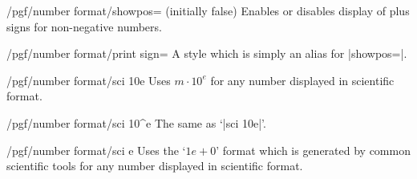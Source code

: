 \begin{key}{/pgf/number format/showpos= (initially false)}
    Enables or disables display of plus signs for non-negative numbers.
\begin{codeexample}[pre={\begin{lateximage}},post={\end{lateximage}}]
\end{codeexample}

\begin{codeexample}[pre={\begin{lateximage}},post={\end{lateximage}}]
\end{codeexample}

\begin{codeexample}[pre={\begin{lateximage}},post={\end{lateximage}}]
\end{codeexample}
\end{key}

\begin{stylekey}{/pgf/number format/print sign=}
    A style which is simply an alias for |showpos=|.
\end{stylekey}

\begin{key}{/pgf/number format/sci 10e}
    Uses $m \cdot 10^e$ for any number displayed in scientific format.

\begin{codeexample}[pre={\begin{lateximage}},post={\end{lateximage}}]
\end{codeexample}
\end{key}

\begin{key}{/pgf/number format/sci 10\textasciicircum e}
    The same as `|sci 10e|'.
\end{key}

\begin{key}{/pgf/number format/sci e}
    Uses the `$1e{+}0$' format which is generated by common scientific tools
    for any number displayed in scientific format.

\begin{codeexample}[pre={\begin{lateximage}},post={\end{lateximage}}]
\end{codeexample}
\end{key}

